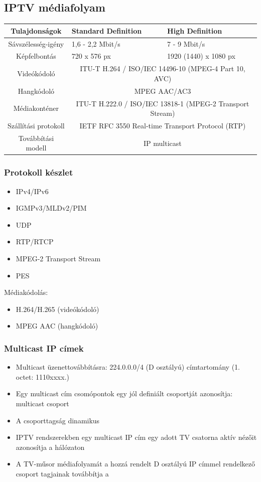 \documentclass[10pt,a4paper]{article}
\begin{document}
\subsection{IPTV médiafolyam}
\begin{center}
	\begin{tabularx}{\linewidth}{|c|X|X|}
	\hline 
	Tulajdonságok & Standard Definition & High Definition \\ 
	\hline 
	\hline
	Sávszélesség-igény & 1,6 - 2,2 Mbit/s & 7 - 9 Mbit/s \\ 
	\hline 
	Képfelbontás & 720 x 576 px & 1920 (1440) x 1080 px \\ 
	\hline 
	Videókódoló  & \multicolumn{2}{c|}{ITU-T H.264 /
		ISO/IEC 14496-10 (MPEG-4 Part 10, AVC)} \\ 
	\hline 
	Hangkódoló  & \multicolumn{2}{c|}{MPEG AAC/AC3} \\ 
	\hline 
	Médiakonténer & \multicolumn{2}{c|}{ITU-T H.222.0 /
		ISO/IEC 13818-1 (MPEG-2 Transport Stream)} \\ 
	\hline 
	Szállítási protokoll  & \multicolumn{2}{c|}{IETF RFC 3550
		Real-time Transport Protocol (RTP) } \\ 
	\hline 
	Továbbítási modell & \multicolumn{2}{c|}{IP multicast} \\ 
	\hline 
\end{tabularx} 
\end{center}
\subsubsection{Protokoll készlet}
	\begin{itemize}
		\item IPv4/IPv6
		\item IGMPv3/MLDv2/PIM
		\item UDP
		\item RTP/RTCP
		\item MPEG-2 Transport Stream
		\item PES
	\end{itemize}
Médiakódolás:
	\begin{itemize}
		\item H.264/H.265 (videókódoló)
		\item MPEG AAC (hangkódoló) 
	\end{itemize}
\subsubsection{Multicast IP címek}
\begin{itemize}
	\item Multicast üzenettovábbításra: 224.0.0.0/4 (D osztályú)
	címtartomány (1. octet: 1110xxxx.)
	\item Egy multicast cím csomópontok egy jól definiált
	csoportját azonosítja: multicast csoport
	\item A csoporttagság dinamikus
	\item IPTV rendszerekben egy multicast IP cím egy adott TV
	csatorna aktív nézőit azonosítja a hálózaton
	\item A TV-műsor médiafolyamát a hozzá rendelt D osztályú
	IP címmel rendelkező csoport tagjainak továbbítja a 
\end{itemize}
\end{document}
